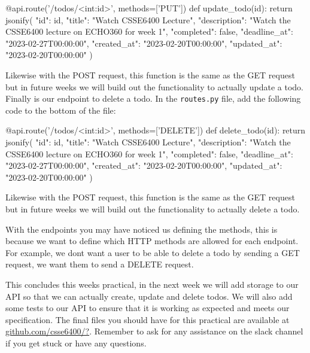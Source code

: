\documentclass{csse4400}
\begin{document}
\begin{code}[language=python]{}
  @api.route('/todos/<int:id>', methods=['PUT'])
  def update_todo(id):
      return jsonify({
        "id": id,
        "title": "Watch CSSE6400 Lecture",
        "description": "Watch the CSSE6400 lecture on ECHO360 for week 1",
        "completed": false,
        "deadline_at": "2023-02-27T00:00:00",
        "created_at": "2023-02-20T00:00:00",
        "updated_at": "2023-02-20T00:00:00"
      })
\end{code}

Likewise with the POST request, this function is the same as the GET request but in future weeks we will build out the functionality to actually update a todo. Finally is our endpoint to delete a todo. In the \texttt{routes.py} file, add the following code to the bottom of the file:

\begin{code}[language=python]{}
  @api.route('/todos/<int:id>', methods=['DELETE'])
  def delete_todo(id):
      return jsonify({
        "id": id,
        "title": "Watch CSSE6400 Lecture",
        "description": "Watch the CSSE6400 lecture on ECHO360 for week 1",
        "completed": false,
        "deadline_at": "2023-02-27T00:00:00",
        "created_at": "2023-02-20T00:00:00",
        "updated_at": "2023-02-20T00:00:00"
      })
\end{code}

Likewise with the POST request, this function is the same as the GET request but in future weeks we will build out the functionality to actually delete a todo.

With the endpoints you may have noticed us defining the methods, this is because we want to define which HTTP methods are allowed for each endpoint. For example, we dont want a user to be able to delete a todo by sending a GET request, we want them to send a DELETE request.

This concludes this weeks practical, in the next week we will add storage to our API so that we can actually create, update and delete todos. We will also add some tests to our API to ensure that it is working as expected and meets our specification. The final files you should have for this practical are available at \url{github.com/csse6400/?}. Remember to ask for any assistance on the slack channel if you get stuck or have any questions.




\end{document}
